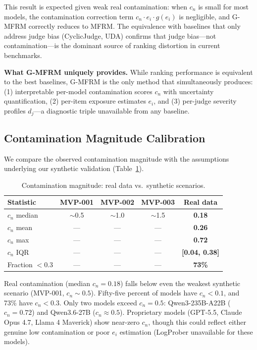 \documentclass[11pt]{article}
\newcommand{\gmfrm}{G-MFRM}
\newcommand{\cn}{c_n}
\newcommand{\ei}{e_i}
\renewcommand{\dj}{d_j}
\begin{document}
This result is expected given weak real contamination: when $\cn$ is small for most models, the contamination correction term $\cn \cdot \ei \cdot g(\ei)$ is negligible, and \gmfrm{} correctly reduces to MFRM. The equivalence with baselines that only address judge bias (CyclicJudge, UDA) confirms that judge bias---not contamination---is the dominant source of ranking distortion in current benchmarks.

\textbf{What \gmfrm{} uniquely provides.} While ranking performance is equivalent to the best baselines, \gmfrm{} is the only method that simultaneously produces: (1) interpretable per-model contamination scores $\cn$ with uncertainty quantification, (2) per-item exposure estimates $\ei$, and (3) per-judge severity profiles $\dj$---a diagnostic triple unavailable from any baseline.

\subsection{Contamination Magnitude Calibration}
\label{sec:calibration}

We compare the observed contamination magnitude with the assumptions underlying our synthetic validation (Table~\ref{tab:contamination_calibration}).

\begin{table}[t]
\centering
\caption{Contamination magnitude: real data vs.\ synthetic scenarios.}
\label{tab:contamination_calibration}
\small
\begin{tabular}{lcccc}
\toprule
Statistic & MVP-001 & MVP-002 & MVP-003 & \textbf{Real data} \\
\midrule
$\cn$ median & $\sim$0.5 & $\sim$1.0 & $\sim$1.5 & \textbf{0.18} \\
$\cn$ mean & --- & --- & --- & \textbf{0.26} \\
$\cn$ max & --- & --- & --- & \textbf{0.72} \\
$\cn$ IQR & --- & --- & --- & \textbf{[0.04, 0.38]} \\
Fraction $< 0.3$ & --- & --- & --- & \textbf{73\%} \\
\bottomrule
\end{tabular}
\end{table}

Real contamination (median $\cn = 0.18$) falls below even the weakest synthetic scenario (MVP-001, $\cn \sim 0.5$). Fifty-five percent of models have $\cn < 0.1$, and 73\% have $\cn < 0.3$. Only two models exceed $\cn = 0.5$: Qwen3-235B-A22B ($\cn = 0.72$) and Qwen3.6-27B ($\cn \approx 0.5$). Proprietary models (GPT-5.5, Claude Opus 4.7, Llama 4 Maverick) show near-zero $\cn$, though this could reflect either genuine low contamination or poor $\ei$ estimation (LogProber unavailable for these models).
\end{document}
